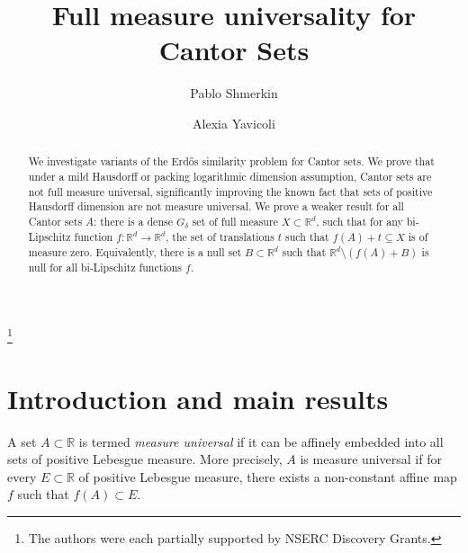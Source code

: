 \documentclass[12pt]{amsart}
\def\R{{\mathbb{R}}}
\numberwithin{theorem}{section}
\numberwithin{equation}{section}
\begin{document}
\thispagestyle{empty}

\title{Full measure universality for Cantor Sets}

\author{Pablo Shmerkin}
\address{Department of Mathematics, The University of British Columbia, 1984 Mathematics Road, Vancouver BC V6T 1Z2, Canada}

\author{Alexia Yavicoli}
\address{Department of Mathematics, The University of British Columbia, 1984 Mathematics Road, Vancouver BC V6T 1Z2, Canada}


\thanks{The authors were each partially supported by NSERC Discovery Grants.}

\begin{abstract}
    We investigate variants of the Erd\H{o}s similarity problem for Cantor sets. We prove that under a mild Hausdorff or packing logarithmic dimension assumption, Cantor sets are not full measure universal, significantly improving the known fact that sets of positive Hausdorff dimension are not measure universal. We prove a weaker result for all Cantor sets $A$: there is a dense $G_\delta$ set of full measure $X\subset\mathbb{R}^d$, such that for any bi-Lipschitz function $f:\mathbb{R}^d\to \mathbb{R}^d$, the set of translations $t$ such that $f(A)+t\subseteq X$ is of measure zero. Equivalently, there is a null set $B\subset\mathbb{R}^d$ such that $\mathbb{R}^d\setminus (f(A)+B)$ is null for all bi-Lipschitz functions $f$.

\end{abstract}

\maketitle



\section{Introduction and main results}

A set $A\subset \R$ is termed \emph{measure universal} if it can be affinely embedded into all sets of positive Lebesgue measure. More precisely, $A$ is measure universal if for every $E\subset\R$ of positive Lebesgue measure, there exists a non-constant affine map $f$ such that $f(A)\subset E$.
\end{document}
